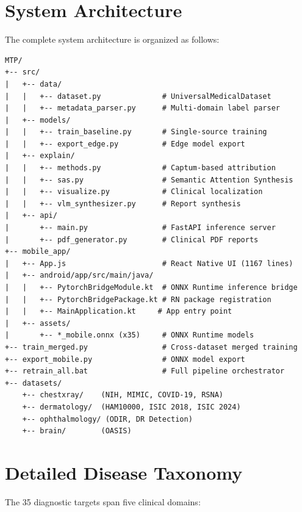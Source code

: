 \documentclass[12pt,a4paper]{report}
\begin{document}
\appendix
\chapter{System Architecture}

The complete system architecture is organized as follows:

\begin{verbatim}
MTP/
+-- src/
|   +-- data/
|   |   +-- dataset.py              # UniversalMedicalDataset
|   |   +-- metadata_parser.py      # Multi-domain label parser
|   +-- models/
|   |   +-- train_baseline.py       # Single-source training
|   |   +-- export_edge.py          # Edge model export
|   +-- explain/
|   |   +-- methods.py              # Captum-based attribution
|   |   +-- sas.py                  # Semantic Attention Synthesis
|   |   +-- visualize.py            # Clinical localization
|   |   +-- vlm_synthesizer.py      # Report synthesis
|   +-- api/
|       +-- main.py                 # FastAPI inference server
|       +-- pdf_generator.py        # Clinical PDF reports
+-- mobile_app/
|   +-- App.js                      # React Native UI (1167 lines)
|   +-- android/app/src/main/java/
|   |   +-- PytorchBridgeModule.kt  # ONNX Runtime inference bridge
|   |   +-- PytorchBridgePackage.kt # RN package registration
|   |   +-- MainApplication.kt     # App entry point
|   +-- assets/
|       +-- *_mobile.onnx (x35)     # ONNX Runtime models
+-- train_merged.py                 # Cross-dataset merged training
+-- export_mobile.py                # ONNX model export
+-- retrain_all.bat                 # Full pipeline orchestrator
+-- datasets/
    +-- chestxray/    (NIH, MIMIC, COVID-19, RSNA)
    +-- dermatology/  (HAM10000, ISIC 2018, ISIC 2024)
    +-- ophthalmology/ (ODIR, DR Detection)
    +-- brain/        (OASIS)
\end{verbatim}

\chapter{Detailed Disease Taxonomy}

The 35 diagnostic targets span five clinical domains:
\end{document}
